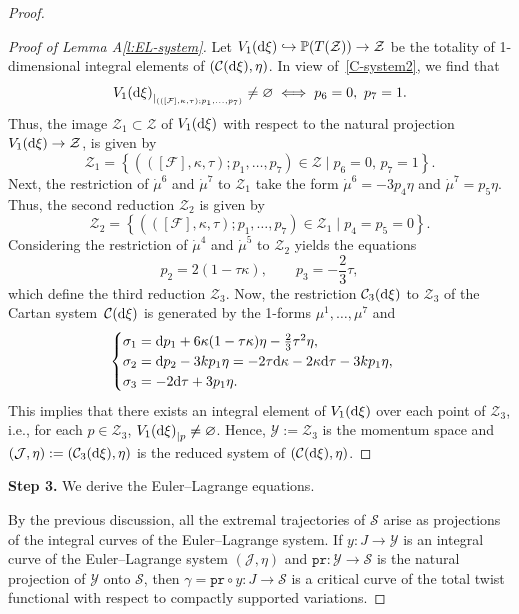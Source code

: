 \documentclass[10pt,a4paper]{amsart}
\numberwithin{equation}{section}
\def\S{\mathcal{S}}
\def\S{\mathcal{S}}
\begin{document}
\begin{proof}
\begin{proof}[Proof of Lemma A\ref{l:EL-system}]
Let $V_1({\rm d}\xi) \hookrightarrow \mathbb{P}(T(\mathcal{Z})) \to \mathcal{Z}$ be the totality of 1-dimensional integral elements of
$(\mathcal{C}({\rm d}\xi),\eta)$. In view of~\eqref{C-system2}, we find that
\[
{V_1({\rm d}\xi)}_{|_{(([\mathcal{F}], \kappa, \tau); p_1,\dots,p_7)}} \neq \varnothing \iff p_6 =0, \ p_7 =1.
\]
Thus,
the image $\mathcal{Z}_1 \subset \mathcal{Z}$
of $V_1({\rm d}\xi)$ with respect to the natural projection $V_1({\rm d}\xi) \to \mathcal{Z}$, is given by
\[
 \mathcal{Z}_1= \left\{ (([\mathcal{F}], \kappa, \tau); p_1,\dots,p_7) \in \mathcal{Z} \mid p_6 =0, \, p_7 =1 \right\}.
 \]
Next, the restriction of $\dot\mu^6$ and $\dot\mu^7$ to $\mathcal{Z}_1$ take the form $\dot\mu^6=-3p_4\eta$
and $\dot\mu^7=p_5\eta$.
Thus, the second
reduction
$ \mathcal{Z}_2$ is given by
\[
 \mathcal{Z}_2= \left\{ (([\mathcal{F}], \kappa, \tau); p_1,\dots,p_7) \in \mathcal{Z}_1 \mid p_4 = p_5 = 0 \right\}.
 \]
Considering the restriction of $\dot\mu^4$ and $\dot\mu^5$ to $\mathcal{Z}_2$ yields the equations
\[
 p_2=2(1-\tau\kappa), \qquad p_3 = -\frac23\tau  ,
\]
which define the third reduction
$\mathcal{Z}_3$. Now, the restriction $\mathcal{C}_3({\rm d}\xi)$ to
$\mathcal{Z}_3$ of the Cartan system~$\mathcal{C}({\rm d}\xi)$ is generated by the 1-forms $\mu^1, \dots, \mu^7$
and
\[
\begin{cases}
\sigma_1 = {\rm d}p_1 + 6 \kappa (1-\tau\kappa)\eta -\frac23 \tau^2\eta  ,\\
\sigma_2 = {\rm d}p_2 -3kp_1 \eta = -2\tau {\rm d}\kappa -2\kappa {\rm d}\tau -3kp_1 \eta ,\\
\sigma_3 = - 2{\rm d}\tau + 3 p_1 \eta .
\end{cases}
\]
This implies that there exists an integral element of $V_1({\rm d}\xi)$ over each point of $\mathcal{Z}_3$,
i.e., for each $p\in \mathcal{Z}_3$, ${V_1({\rm d}\xi)}_{|p} \neq \varnothing$. Hence, $\mathcal{Y} := \mathcal{Z}_3$
is the momentum space and $(\mathcal{J}, \eta) := (\mathcal{C}_3({\rm d}\xi), \eta)$ is the
reduced system of
$(\mathcal{C}({\rm d}\xi), \eta)$. \end{proof}

\textbf{Step 3.} We derive the Euler--Lagrange equations.

By the previous discussion, all the extremal trajectories of $\S$ arise as
projections of the
integral curves of the Euler--Lagrange system. If $y\colon J \to \mathcal{Y}$ is an integral curve
of the Euler--Lagrange system $(\mathcal{J}, \eta)$ and $\mathtt{pr}\colon \mathcal{Y} \to \S$
is the natural projection of $\mathcal{Y}$ onto $\S$, then $\gamma= \mathtt{pr}\circ y\colon J \to \S$
is a critical curve of the total twist functional with respect to compactly supported variations.


\end{proof}
\end{document}
